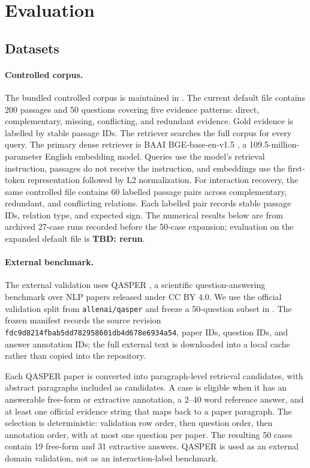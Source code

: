\documentclass[10pt]{article}
\newcommand{\tbd}[1]{\textbf{TBD: #1}}
\begin{document}
\section{Evaluation}
\subsection{Datasets}
\paragraph{Controlled corpus.}
The bundled controlled corpus is maintained in
. The current default file contains
200 passages and 50 questions covering five evidence patterns: direct,
complementary, missing, conflicting, and redundant evidence. Gold evidence is
labelled by stable passage IDs. The retriever searches the full corpus for
every query.
The primary dense retriever is BAAI BGE-base-en-v1.5
\cite{xiao2023cpack}, a 109.5-million-parameter English embedding model.
Queries use the model's retrieval instruction,
passages do not receive the instruction, and embeddings use the first-token
representation followed by L2 normalization.
For interaction recovery, the same controlled file contains 60 labelled
passage pairs across complementary, redundant, and conflicting relations. Each
labelled pair records stable passage IDs, relation type, and expected sign.
The numerical results below are from archived 27-case runs recorded before the
50-case expansion; evaluation on the expanded default file is \tbd{rerun}.

\paragraph{External benchmark.}
The external validation uses QASPER \cite{dasigi2021qasper}, a scientific
question-answering benchmark over NLP papers released under CC BY 4.0. We use
the official validation split from \texttt{allenai/qasper} and freeze a
50-question subset in
. The frozen manifest records the
source revision
\texttt{fdc9d8214fbab5dd782958601db4d678e6934a54}, paper IDs, question IDs, and
answer annotation IDs; the full external text is downloaded into a local cache
rather than copied into the repository.

Each QASPER paper is converted into paragraph-level retrieval candidates, with
abstract paragraphs included as candidates. A case is eligible when it has an
answerable free-form or extractive annotation, a 2--40 word reference answer,
and at least one official evidence string that maps back to a paper paragraph.
The selection is deterministic: validation row order, then question order, then
annotation order, with at most one question per paper. The resulting 50 cases
contain 19 free-form and 31 extractive answers. QASPER is used as an external
domain validation, not as an interaction-label benchmark.
\end{document}
